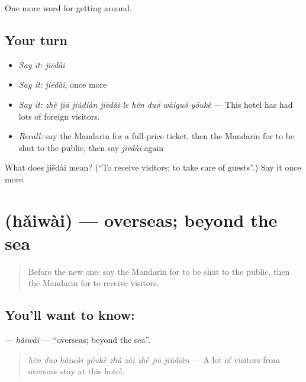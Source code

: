 \begin{grammarlens}[title={What you've built}]
One more word for getting around.
\end{grammarlens}

\subsection*{Your turn}
\begin{itemize}
\raggedright
  \item \emph{Say it:} \emph{jiēdài}
  \item \emph{Say it:} \emph{jiēdài}, once more
  \item \emph{Say it:} \emph{zhè jiā jiǔdiàn jiēdài le hěn duō wàiguó yóukè} — This hotel has had lots of foreign visitors.
  \item \emph{Recall:} say the Mandarin for a full-price ticket, then the Mandarin for to be shut to the public, then say \emph{jiēdài} again
\end{itemize}

\begin{tcolorbox}[breakable,colback=teal!4,colframe=teal!35!black,title={Before you move on}]
What does jiēdài mean? (\textquotedblleft{}To receive visitors; to take care of guests\textquotedblright{}.) Say it once more.
\end{tcolorbox}
\section[\texorpdfstring{\zh{海外} (hǎiwài)}{海外 (hǎiwài)}]{ (hǎiwài) — overseas; beyond the sea}

\label{lesson:ZH-C433-haiwai}



\begin{quote}
Before the new one: say the Mandarin for to be shut to the public, then the Mandarin for to receive visitors.
\end{quote}

\subsection*{You'll want to know: }
\textbf{} — \emph{hǎiwài} — \textquotedblleft{}overseas; beyond the sea\textquotedblright{}.

\begin{quote}
\emph{hěn duō hǎiwài yóukè zhù zài zhè jiā jiǔdiàn} — A lot of visitors from overseas stay at this hotel.
\end{quote}

